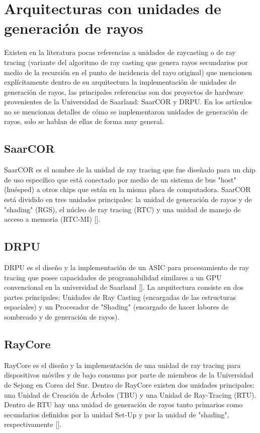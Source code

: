 \section{Arquitecturas con unidades de generación de rayos}

Existen en la literatura pocas referencias a unidades de raycasting o de ray tracing (variante del algoritmo de ray casting que genera rayos secundarios por medio de la recursión en el punto de incidencia del rayo original) que mencionen explícitamente dentro de su arquitectura la implementación de unidades de generación de rayos, las principales referencias son dos proyectos de hardware provenientes de la Universidad de Saarland: SaarCOR y DRPU. En los artículos no se mencionan detalles de cómo se implementaron unidades de generación de rayos, solo se hablan de ellas de forma muy general.

\subsection{SaarCOR}

SaarCOR es el nombre de la unidad de ray tracing que fue diseñado para un chip de uso específico que está conectado por medio de un sistema de bus "host" (huésped) a otros chips que están en la misma placa de computadora. SaarCOR está dividido en tres unidades principales: la unidad de generación de rayos y de "shading" (RGS), el núcleo de ray tracing (RTC) y una unidad de manejo de acceso a memoria (RTC-MI) [\cite{Schmittler2004}]. 

\subsection{DRPU}

DRPU es el diseño y la implementación de un ASIC para procesamiento de ray tracing que posee capacidades de programabilidad similares a un GPU convencional en la universidad de Saarland [\cite{Woop2006}]. La arquitectura consiste en dos partes principales: Unidades de Ray Casting (encargadas de las estructuras espaciales) y un Procesador de "Shading" (encargado de hacer labores de sombreado y de generación de rayos).  

\subsection{RayCore}

RayCore es el diseño y la implementación de una unidad de ray tracing para dispositivos móviles y de bajo consumo por parte de miembros de la Universidad de Sejong en Corea del Sur. Dentro de RayCore existen dos unidades principales: una Unidad de Creación de Árboles (TBU) y una Unidad de Ray-Tracing (RTU). Dentro de RTU hay una unidad de generación de rayos tanto primarios como secundarios definidos por la unidad Set-Up y por la unidad de "shading", respectivamente [\cite{Nah2014}].   

